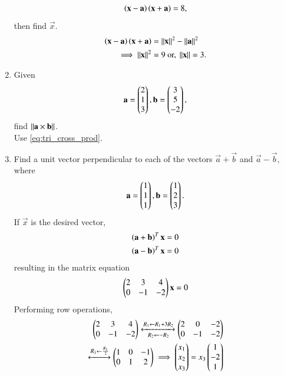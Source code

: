 \begin{enumerate}[label=\arabic*.,ref=\thesubsection.\theenumi]
%
\begin{align}
\left(\mathbf{x}-\mathbf{a}\right)\left(\mathbf{x}+\mathbf{a}\right) = 8, 
\end{align}
%
then find $\vec{x}$.
%
\\
\solution 
%
\begin{align}
\left(\mathbf{x}-\mathbf{a}\right)\left(\mathbf{x}+\mathbf{a}\right) &= \left\lVert\mathbf{x}\right\rVert^2-\left\lVert\mathbf{a}\right\rVert^2
\\
\implies \left\lVert\mathbf{x}\right\rVert^2 &= 9 \text{ or, } \left\lVert\mathbf{x}\right\rVert = 3.
\end{align}
%
\item Given
\begin{align}
\mathbf{a}=\begin{pmatrix}2\\1\\3\end{pmatrix},
\mathbf{b}=\begin{pmatrix}3\\5\\-2\end{pmatrix},
\end{align}
find $\left\lVert\mathbf{a} \times \mathbf{b}\right\rVert$.
%
\\
\solution Use \eqref{eq:tri_cross_prod}.
%
\item Find a unit vector perpendicular to each of the vectors
$\vec{a}+\vec{b}$ and $\vec{a}-\vec{b}$, where 
\begin{align}
\mathbf{a}=\begin{pmatrix}1\\1\\1\end{pmatrix},
\mathbf{b}=\begin{pmatrix}1\\2\\3\end{pmatrix}.
\end{align}
%
\solution If $\vec{x}$ is the desired vector, 
%
\begin{align}
\left(\mathbf{a}+\mathbf{b}\right)^T\mathbf{x}=0
\\
\left(\mathbf{a}-\mathbf{b}\right)^T\mathbf{x}=0
\end{align}
%
resulting in the matrix equation 
%
\begin{align}
\begin{pmatrix}2 & 3 & 4\\
0 & -1 & -2\end{pmatrix}\mathbf{x} = 0
\end{align}
%
Performing row operations, 
%
\begin{align}
\myvec{2 & 3 & 4\\
0 & -1 & -2}
\xleftrightarrow[R_2 \leftarrow -R_2]{R_1\leftarrow R_1+3R_2}
\myvec{
2 & 0 & -2\\
0 & -1 & -2
} 
\\
\xleftrightarrow{R_1\leftarrow \frac{R_1}{2}}
\myvec{
1 & 0 & -1\\
0 & 1 & 2
} 
\implies \myvec{x_1\\x_2\\x_3} = x_3\myvec{1\\-2\\1}

\end{align}
\end{enumerate}
